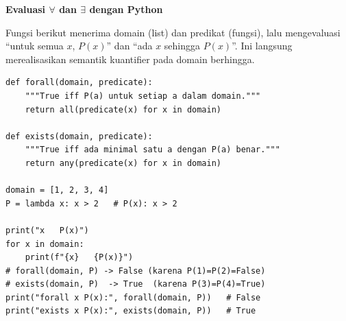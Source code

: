 \begin{contoh}
\textbf{Evaluasi $\forall$ dan $\exists$ dengan Python} \cite{python_docs_boolean,rosen2019}

Fungsi berikut menerima domain (list) dan predikat (fungsi), lalu mengevaluasi ``untuk semua $x$, $P(x)$'' dan ``ada $x$ sehingga $P(x)$''. Ini langsung merealisasikan semantik kuantifier pada domain berhingga.

\begin{lstlisting}[style=pythonstyle, caption={Evaluasi kuantifier universal dan eksistensial pada domain diskret}]
def forall(domain, predicate):
    """True iff P(a) untuk setiap a dalam domain."""
    return all(predicate(x) for x in domain)

def exists(domain, predicate):
    """True iff ada minimal satu a dengan P(a) benar."""
    return any(predicate(x) for x in domain)

domain = [1, 2, 3, 4]
P = lambda x: x > 2   # P(x): x > 2

print("x   P(x)")
for x in domain:
    print(f"{x}   {P(x)}")
# forall(domain, P) -> False (karena P(1)=P(2)=False)
# exists(domain, P)  -> True  (karena P(3)=P(4)=True)
print("forall x P(x):", forall(domain, P))   # False
print("exists x P(x):", exists(domain, P))   # True
\end{lstlisting}
\end{contoh}
